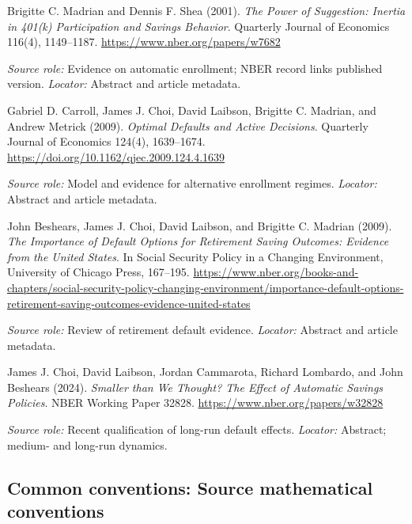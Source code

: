 \documentclass[11pt,a4paper]{article}
\begin{document}
\begin{enumerate}[label={[S\arabic*]},leftmargin=*]

\item Brigitte C. Madrian and Dennis F. Shea (2001). \emph{The Power of Suggestion: Inertia in 401(k) Participation and Savings Behavior}. Quarterly Journal of Economics 116(4), 1149--1187. \url{https://www.nber.org/papers/w7682}\par \textit{Source role:} Evidence on automatic enrollment; NBER record links published version. \textit{Locator:} Abstract and article metadata.

\item Gabriel D. Carroll, James J. Choi, David Laibson, Brigitte C. Madrian, and Andrew Metrick (2009). \emph{Optimal Defaults and Active Decisions}. Quarterly Journal of Economics 124(4), 1639--1674. \url{https://doi.org/10.1162/qjec.2009.124.4.1639}\par \textit{Source role:} Model and evidence for alternative enrollment regimes. \textit{Locator:} Abstract and article metadata.

\item John Beshears, James J. Choi, David Laibson, and Brigitte C. Madrian (2009). \emph{The Importance of Default Options for Retirement Saving Outcomes: Evidence from the United States}. In Social Security Policy in a Changing Environment, University of Chicago Press, 167--195. \url{https://www.nber.org/books-and-chapters/social-security-policy-changing-environment/importance-default-options-retirement-saving-outcomes-evidence-united-states}\par \textit{Source role:} Review of retirement default evidence. \textit{Locator:} Abstract and article metadata.

\item James J. Choi, David Laibson, Jordan Cammarota, Richard Lombardo, and John Beshears (2024). \emph{Smaller than We Thought? The Effect of Automatic Savings Policies}. NBER Working Paper 32828. \url{https://www.nber.org/papers/w32828}\par \textit{Source role:} Recent qualification of long-run default effects. \textit{Locator:} Abstract; medium- and long-run dynamics.

\end{enumerate}

\subsection*{Common conventions: Source mathematical conventions}
\end{document}
